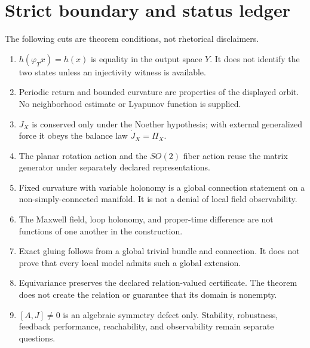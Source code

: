 \documentclass[11pt,letterpaper]{article}
\theoremstyle{dynamicsstyle}
\newcommand{\Flow}{\varphi}
\begin{document}
\section{Strict boundary and status ledger}\label{sec:boundary}

The following cuts are theorem conditions, not rhetorical disclaimers.
\begin{enumerate}[label=\textup{(\alph*)}]
  \item $h(\Flow_Tx)=h(x)$ is equality in the output space $Y$.  It does not identify the two states unless an injectivity witness is available.
  \item Periodic return and bounded curvature are properties of the displayed orbit.  No neighborhood estimate or Lyapunov function is supplied.
  \item $J_X$ is conserved only under the Noether hypothesis; with external generalized force it obeys the balance law $\dot J_X=\Pi_X$.
  \item The planar rotation action and the $SO(2)$ fiber action reuse the matrix generator under separately declared representations.
  \item Fixed curvature with variable holonomy is a global connection statement on a non-simply-connected manifold.  It is not a denial of local field observability.
  \item The Maxwell field, loop holonomy, and proper-time difference are not functions of one another in the construction.
  \item Exact gluing follows from a global trivial bundle and connection.  It does not prove that every local model admits such a global extension.
  \item Equivariance preserves the declared relation-valued certificate.  The theorem does not create the relation or guarantee that its domain is nonempty.
  \item $[A,J]\ne0$ is an algebraic symmetry defect only.  Stability, robustness, feedback performance, reachability, and observability remain separate questions.
\end{enumerate}
\end{document}
